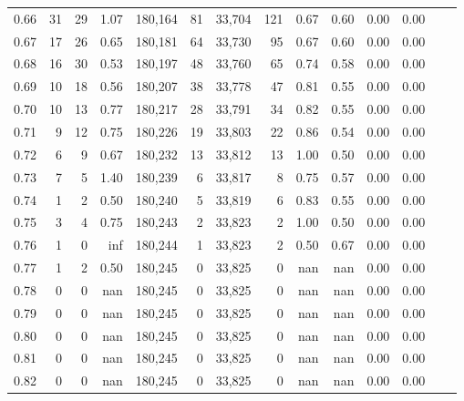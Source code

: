 \begin{tabular}{rrrrrrrrrrrrrr}
0.66 &      31 &     29 &    1.07 &  180,164 &       81 &  33,704 &     121 &  0.67 &  0.60 &  0.00 &      0.00 \\
0.67 &      17 &     26 &    0.65 &  180,181 &       64 &  33,730 &      95 &  0.67 &  0.60 &  0.00 &      0.00 \\
0.68 &      16 &     30 &    0.53 &  180,197 &       48 &  33,760 &      65 &  0.74 &  0.58 &  0.00 &      0.00 \\
0.69 &      10 &     18 &    0.56 &  180,207 &       38 &  33,778 &      47 &  0.81 &  0.55 &  0.00 &      0.00 \\
0.70 &      10 &     13 &    0.77 &  180,217 &       28 &  33,791 &      34 &  0.82 &  0.55 &  0.00 &      0.00 \\
0.71 &       9 &     12 &    0.75 &  180,226 &       19 &  33,803 &      22 &  0.86 &  0.54 &  0.00 &      0.00 \\
0.72 &       6 &      9 &    0.67 &  180,232 &       13 &  33,812 &      13 &  1.00 &  0.50 &  0.00 &      0.00 \\
0.73 &       7 &      5 &    1.40 &  180,239 &        6 &  33,817 &       8 &  0.75 &  0.57 &  0.00 &      0.00 \\
0.74 &       1 &      2 &    0.50 &  180,240 &        5 &  33,819 &       6 &  0.83 &  0.55 &  0.00 &      0.00 \\
0.75 &       3 &      4 &    0.75 &  180,243 &        2 &  33,823 &       2 &  1.00 &  0.50 &  0.00 &      0.00 \\
0.76 &       1 &      0 &     inf &  180,244 &        1 &  33,823 &       2 &  0.50 &  0.67 &  0.00 &      0.00 \\
0.77 &       1 &      2 &    0.50 &  180,245 &        0 &  33,825 &       0 &   nan &   nan &  0.00 &      0.00 \\
0.78 &       0 &      0 &     nan &  180,245 &        0 &  33,825 &       0 &   nan &   nan &  0.00 &      0.00 \\
0.79 &       0 &      0 &     nan &  180,245 &        0 &  33,825 &       0 &   nan &   nan &  0.00 &      0.00 \\
0.80 &       0 &      0 &     nan &  180,245 &        0 &  33,825 &       0 &   nan &   nan &  0.00 &      0.00 \\
0.81 &       0 &      0 &     nan &  180,245 &        0 &  33,825 &       0 &   nan &   nan &  0.00 &      0.00 \\
0.82 &       0 &      0 &     nan &  180,245 &        0 &  33,825 &       0 &   nan &   nan &  0.00 &      0.00 \\

\end{tabular}

